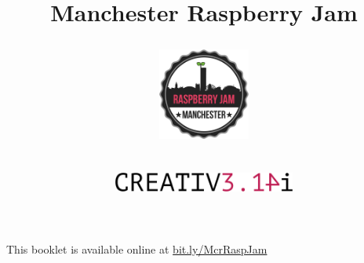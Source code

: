 \ifprint
	\title{Manchester Raspberry Jam \\ \workshopTitle}
\else
	\title{
		\begin{center}
			\includegraphics[width=30mm]{McrRaspJam/Common/logo-512}
		\end{center}
		\begin{center}
			\includegraphics[width=60mm]{McrRaspJam/015_MinecraftSenseHAT/creative-pi-1024}
		\end{center}
		\vspace{12pt}
		\workshopTitle
	}
\fi

\author{}
\date{\vspace{-44pt}}
\maketitle


\ifprint
	\begin{mdframed}[rightline=false, leftline=false]
		\scriptsize
		This booklet is available online at \mbox{\href{https://drive.google.com/open?id=0B_1SFjX_5JrmfnhpX0pPRXl6bmJNal8zdUxMeWZOdjJyZVdzU3V6UnBGdlVIMENtbFFkbVk}{bit.ly/McrRaspJam}}
		\normalsize
	\end{mdframed}
\fi
